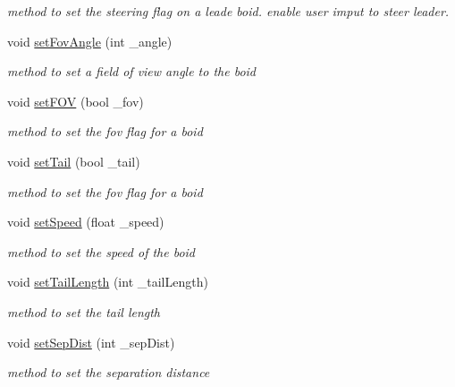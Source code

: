 \begin{DoxyCompactItemize}
\begin{DoxyCompactList}\small\item\em method to set the steering flag on a leade boid. enable user imput to steer leader. \item\end{DoxyCompactList}\item 
void \hyperlink{classBoid_a40bc1ac10a4e2769ee315f7adfd39147}{setFovAngle} (int \_\-angle)
\begin{DoxyCompactList}\small\item\em method to set a field of view angle to the boid \item\end{DoxyCompactList}\item 
void \hyperlink{classBoid_a3043cc98a80c99cc2af2e8961089390d}{setFOV} (bool \_\-fov)
\begin{DoxyCompactList}\small\item\em method to set the fov flag for a boid \item\end{DoxyCompactList}\item 
void \hyperlink{classBoid_a761d48b1e156b4da4edad7854a59daa8}{setTail} (bool \_\-tail)
\begin{DoxyCompactList}\small\item\em method to set the fov flag for a boid \item\end{DoxyCompactList}\item 
void \hyperlink{classBoid_a6a8b730efcf6b98cbf56aaa905bc7508}{setSpeed} (float \_\-speed)
\begin{DoxyCompactList}\small\item\em method to set the speed of the boid \item\end{DoxyCompactList}\item 
void \hyperlink{classBoid_ae5c5816d17ad825545455a6fad47f9ae}{setTailLength} (int \_\-tailLength)
\begin{DoxyCompactList}\small\item\em method to set the tail length \item\end{DoxyCompactList}\item 
void \hyperlink{classBoid_a8b2d2ef70003c3b46c22ec3866f842ec}{setSepDist} (int \_\-sepDist)
\begin{DoxyCompactList}\small\item\em method to set the separation distance \item\end{DoxyCompactList}\item 

\end{DoxyCompactItemize}
